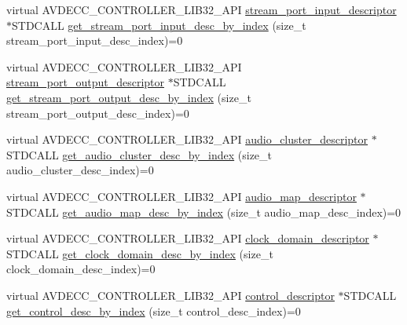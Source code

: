 \begin{DoxyCompactItemize}
\item 
virtual A\+V\+D\+E\+C\+C\+\_\+\+C\+O\+N\+T\+R\+O\+L\+L\+E\+R\+\_\+\+L\+I\+B32\+\_\+\+A\+PI \hyperlink{classavdecc__lib_1_1stream__port__input__descriptor}{stream\+\_\+port\+\_\+input\+\_\+descriptor} $\ast$S\+T\+D\+C\+A\+LL \hyperlink{classavdecc__lib_1_1configuration__descriptor_ad05646251e84a4024f317dd82395b8f7}{get\+\_\+stream\+\_\+port\+\_\+input\+\_\+desc\+\_\+by\+\_\+index} (size\+\_\+t stream\+\_\+port\+\_\+input\+\_\+desc\+\_\+index)=0
\item 
virtual A\+V\+D\+E\+C\+C\+\_\+\+C\+O\+N\+T\+R\+O\+L\+L\+E\+R\+\_\+\+L\+I\+B32\+\_\+\+A\+PI \hyperlink{classavdecc__lib_1_1stream__port__output__descriptor}{stream\+\_\+port\+\_\+output\+\_\+descriptor} $\ast$S\+T\+D\+C\+A\+LL \hyperlink{classavdecc__lib_1_1configuration__descriptor_afc0e79843f9b98263f9be9d16197310b}{get\+\_\+stream\+\_\+port\+\_\+output\+\_\+desc\+\_\+by\+\_\+index} (size\+\_\+t stream\+\_\+port\+\_\+output\+\_\+desc\+\_\+index)=0
\item 
virtual A\+V\+D\+E\+C\+C\+\_\+\+C\+O\+N\+T\+R\+O\+L\+L\+E\+R\+\_\+\+L\+I\+B32\+\_\+\+A\+PI \hyperlink{classavdecc__lib_1_1audio__cluster__descriptor}{audio\+\_\+cluster\+\_\+descriptor} $\ast$S\+T\+D\+C\+A\+LL \hyperlink{classavdecc__lib_1_1configuration__descriptor_a36bc7f659fca61d1057b4250d4a92ca8}{get\+\_\+audio\+\_\+cluster\+\_\+desc\+\_\+by\+\_\+index} (size\+\_\+t audio\+\_\+cluster\+\_\+desc\+\_\+index)=0
\item 
virtual A\+V\+D\+E\+C\+C\+\_\+\+C\+O\+N\+T\+R\+O\+L\+L\+E\+R\+\_\+\+L\+I\+B32\+\_\+\+A\+PI \hyperlink{classavdecc__lib_1_1audio__map__descriptor}{audio\+\_\+map\+\_\+descriptor} $\ast$S\+T\+D\+C\+A\+LL \hyperlink{classavdecc__lib_1_1configuration__descriptor_a2d946ae36e146b7a1bbe30e31017f20f}{get\+\_\+audio\+\_\+map\+\_\+desc\+\_\+by\+\_\+index} (size\+\_\+t audio\+\_\+map\+\_\+desc\+\_\+index)=0
\item 
virtual A\+V\+D\+E\+C\+C\+\_\+\+C\+O\+N\+T\+R\+O\+L\+L\+E\+R\+\_\+\+L\+I\+B32\+\_\+\+A\+PI \hyperlink{classavdecc__lib_1_1clock__domain__descriptor}{clock\+\_\+domain\+\_\+descriptor} $\ast$S\+T\+D\+C\+A\+LL \hyperlink{classavdecc__lib_1_1configuration__descriptor_ab5603e0fa2cc0695b240fe856b62776d}{get\+\_\+clock\+\_\+domain\+\_\+desc\+\_\+by\+\_\+index} (size\+\_\+t clock\+\_\+domain\+\_\+desc\+\_\+index)=0
\item 
virtual A\+V\+D\+E\+C\+C\+\_\+\+C\+O\+N\+T\+R\+O\+L\+L\+E\+R\+\_\+\+L\+I\+B32\+\_\+\+A\+PI \hyperlink{classavdecc__lib_1_1control__descriptor}{control\+\_\+descriptor} $\ast$S\+T\+D\+C\+A\+LL \hyperlink{classavdecc__lib_1_1configuration__descriptor_a970929f76405008ad7c5116ba3b71ca7}{get\+\_\+control\+\_\+desc\+\_\+by\+\_\+index} (size\+\_\+t control\+\_\+desc\+\_\+index)=0

\end{DoxyCompactItemize}
